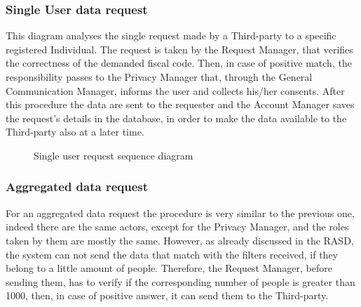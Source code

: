 \subsubsection{Single User data request}
This diagram analyses the single request made by a Third-party to a specific registered Individual.
The request is taken by the Request Manager, that verifies the correctness of the demanded fiscal code. Then, in case of positive match, the responsibility passes to the Privacy Manager that, through the General Communication Manager, informs the user and collects his/her consents.
After this procedure the data are sent to the requester and the Account Manager saves the request's details in the database, in order to make the data available to the Third-party also at a later time.

\begin{figure}[H]
    \centering
    \caption{Single user request sequence diagram}
    \label{fig:log&regDiagram}
\end{figure}

\subsubsection{Aggregated data request}
For an aggregated data request the procedure is very similar to the previous one, indeed there are the same actors, except for the Privacy Manager, and the roles taken by them are mostly the same.
However, as already discussed in the RASD, the system can not send the data that match with the filters received, if they belong to a little amount of people. Therefore, the Request Manager, before sending them, has to verify if the corresponding number of people is greater than 1000, then, in case of positive answer, it can send them to the Third-party.

